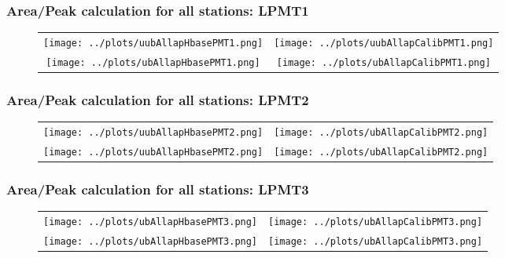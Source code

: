 \documentclass[aspectratio=169]{beamer}
\begin{document}

\begin{frame}
	\frametitle{Area/Peak calculation for all stations: LPMT1}
	
	\begin{figure}
		\centering
		\begin{tabularx}{\textwidth}{CC}
			\texttt{[image: ../plots/uubAllapHbasePMT1.png]}
			&
			\texttt{[image: ../plots/uubAllapCalibPMT1.png]}
			\\
			\texttt{[image: ../plots/ubAllapHbasePMT1.png]}
			&
			\texttt{[image: ../plots/ubAllapCalibPMT1.png]}
		\end{tabularx}
	\end{figure}
\end{frame}

\begin{frame}
	\frametitle{Area/Peak calculation for all stations: LPMT2}
	
	\begin{figure}
		\centering
		\begin{tabularx}{\textwidth}{CC}
			\texttt{[image: ../plots/uubAllapHbasePMT2.png]}
			&
			\texttt{[image: ../plots/ubAllapCalibPMT2.png]}
			\\
			\texttt{[image: ../plots/uubAllapHbasePMT2.png]}
			&
			\texttt{[image: ../plots/ubAllapCalibPMT2.png]}
		\end{tabularx}
	\end{figure}
\end{frame}

\begin{frame}
	\frametitle{Area/Peak calculation for all stations: LPMT3}
	
	\begin{figure}
		\centering
		\begin{tabularx}{\textwidth}{CC}
			\texttt{[image: ../plots/ubAllapHbasePMT3.png]}
			&
			\texttt{[image: ../plots/ubAllapCalibPMT3.png]}
			\\
			\texttt{[image: ../plots/ubAllapHbasePMT3.png]}
			&
			\texttt{[image: ../plots/ubAllapCalibPMT3.png]}
		\end{tabularx}
	\end{figure}
\end{frame}



\end{document}
